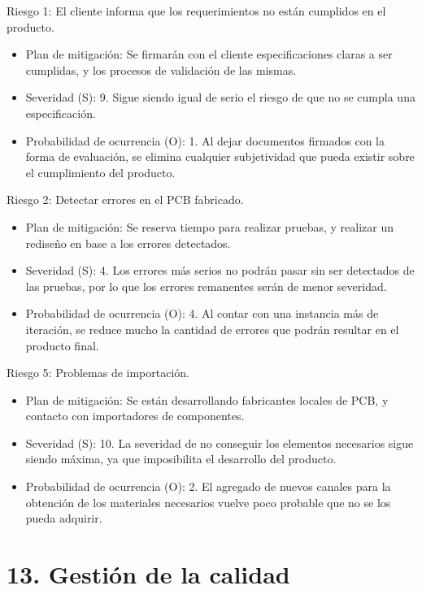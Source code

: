 \documentclass[11pt]{charter}
\begin{document}
Riesgo 1: El cliente informa que los requerimientos no están cumplidos en el producto.
\begin{itemize}
\item Plan de mitigación: Se firmarán con el cliente especificaciones claras a ser cumplidas, y los procesos de validación de las mismas.
\item Severidad (S): 9. Sigue siendo igual de serio el riesgo de que no se cumpla una especificación.
\item Probabilidad de ocurrencia (O): 1. Al dejar documentos firmados con la forma de evaluación, se elimina cualquier subjetividad que pueda existir sobre el cumplimiento del producto.
\end{itemize}
 
Riesgo 2: Detectar errores en el PCB fabricado.
\begin{itemize}
\item Plan de mitigación: Se reserva tiempo para realizar pruebas, y realizar un rediseño en base a los errores detectados.
\item Severidad (S): 4. Los errores más serios no podrán pasar sin ser detectados de las pruebas, por lo que los errores remanentes serán de menor severidad.
\item Probabilidad de ocurrencia (O): 4. Al contar con una instancia más de iteración, se reduce mucho la cantidad de errores que podrán resultar en el producto final.
\end{itemize}
 
Riesgo 5: Problemas de importación.
\begin{itemize}
\item Plan de mitigación: Se están desarrollando fabricantes locales de PCB, y contacto con importadores de componentes.
\item Severidad (S): 10. La severidad de no conseguir los elementos necesarios sigue siendo máxima, ya que imposibilita el desarrollo del producto.
\item Probabilidad de ocurrencia (O): 2. El agregado de nuevos canales para la obtención de los materiales necesarios vuelve poco probable que no se los pueda adquirir.
\end{itemize}

\section{13. Gestión de la calidad}
\label{sec:calidad}
\end{document}
